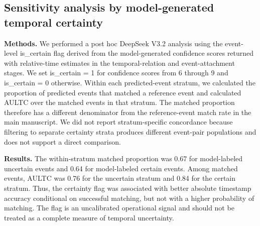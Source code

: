 \FloatBarrier
\subsection{Sensitivity analysis by model-generated temporal certainty}\label{ch08:supp:temporal-certainty}
\noindent
\textbf{Methods.} We performed a post hoc DeepSeek V3.2 analysis using the event-level is\_certain flag derived from the model-generated confidence scores returned with relative-time estimates in the temporal-relation and event-attachment stages. We set is\_certain = 1 for confidence scores from 6 through 9 and is\_certain = 0 otherwise. Within each predicted-event stratum, we calculated the proportion of predicted events that matched a reference event and calculated AULTC over the matched events in that stratum. The matched proportion therefore has a different denominator from the reference-event match rate in the main manuscript. We did not report stratum-specific concordance because filtering to separate certainty strata produces different event-pair populations and does not support a direct comparison.

\noindent
\textbf{Results.} The within-stratum matched proportion was 0.67 for model-labeled uncertain events and 0.64 for model-labeled certain events. Among matched events, AULTC was 0.76 for the uncertain stratum and 0.84 for the certain stratum. Thus, the certainty flag was associated with better absolute timestamp accuracy conditional on successful matching, but not with a higher probability of matching. The flag is an uncalibrated operational signal and should not be treated as a complete measure of temporal uncertainty.

\par\medskip
\noindent


\par\medskip

